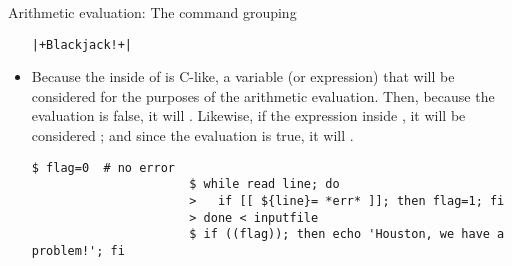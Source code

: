 \begin{frame}[fragile]{Arithmetic evaluation: The command grouping \PB{\texttt{((\ldots))}}}
\begin{overlayarea}{\textwidth}{0.7\textheight}
\begin{itemize}
\begin{lstlisting}[style=MyBash, aboveskip=2mm, belowskip=-6mm]
                      |+Blackjack!+|
                  \end{lstlisting}
            \item<only@2> Because the inside of \PB{\texttt{((\ldots))}} is C-like, a variable (or expression) that  will be considered  for the purposes of the arithmetic evaluation.
                  Then, because the evaluation is false, it will .
                  Likewise, if the expression inside \PB{\texttt{((\ldots))}} , it will be considered ; and since the evaluation is true, it will .
                  \begin{lstlisting}[style=MyBash, aboveskip=2mm, belowskip=-6mm]
                      $ flag=0  # no error
                      $ while read line; do
                      >   if [[ ${line}= *err* ]]; then flag=1; fi
                      > done < inputfile
                      $ if ((flag)); then echo 'Houston, we have a problem!'; fi
                  \end{lstlisting}
        \end{itemize}
    \end{overlayarea}
\end{frame}

